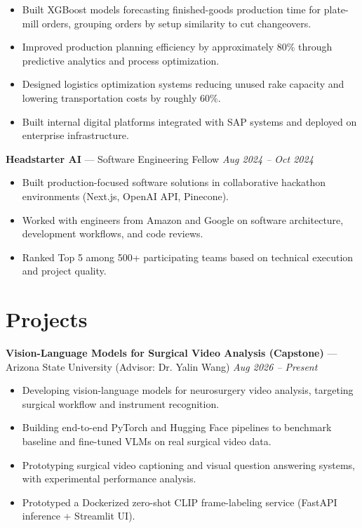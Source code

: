 \documentclass[a4paper,8pt]{extarticle}
\begin{document}
\begin{itemize}
\item Built XGBoost models forecasting finished-goods production time for plate-mill orders, grouping orders by setup similarity to cut changeovers.
\item Improved production planning efficiency by approximately 80\% through predictive analytics and process optimization.
\item Designed logistics optimization systems reducing unused rake capacity and lowering transportation costs by roughly 60\%.
\item Built internal digital platforms integrated with SAP systems and deployed on enterprise infrastructure.
\end{itemize}

\noindent
\textbf{Headstarter AI} --- Software Engineering Fellow
\hfill \textit{Aug 2024 -- Oct 2024}

\begin{itemize}
\item Built production-focused software solutions in collaborative hackathon environments (Next.js, OpenAI API, Pinecone).
\item Worked with engineers from Amazon and Google on software architecture, development workflows, and code reviews.
\item Ranked Top 5 among 500+ participating teams based on technical execution and project quality.
\end{itemize}

\section*{Projects}

\noindent
\textbf{Vision-Language Models for Surgical Video Analysis (Capstone)} --- Arizona State University (Advisor: Dr. Yalin Wang)
\hfill \textit{Aug 2026 -- Present}

\begin{itemize}
\item Developing vision-language models for neurosurgery video analysis, targeting surgical workflow and instrument recognition.
\item Building end-to-end PyTorch and Hugging Face pipelines to benchmark baseline and fine-tuned VLMs on real surgical video data.
\item Prototyping surgical video captioning and visual question answering systems, with experimental performance analysis.
\item Prototyped a Dockerized zero-shot CLIP frame-labeling service (FastAPI inference + Streamlit UI).
\end{itemize}
\end{document}
